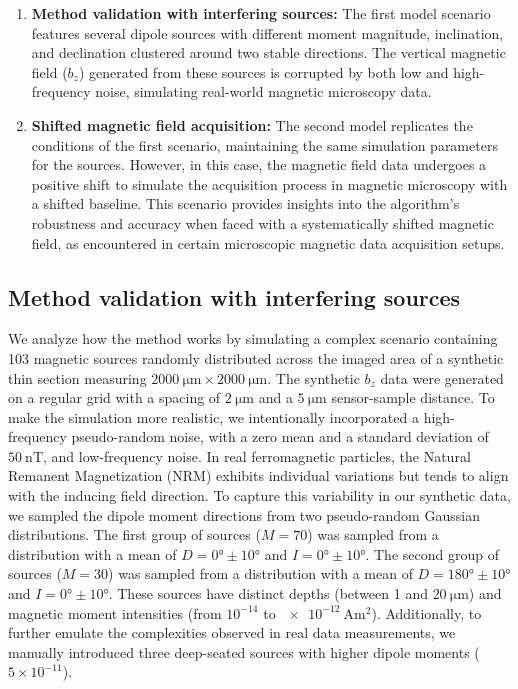 \begin{enumerate}
\item \textbf{Method validation with interfering sources:}
The first model scenario features several dipole sources with different moment magnitude, inclination, and declination clustered around two stable directions. The vertical magnetic field ($b_z$) generated from these sources is corrupted by both low and high-frequency noise, simulating real-world magnetic microscopy data. 

\item \textbf{Shifted magnetic field acquisition:}
The second model replicates the conditions of the first scenario, maintaining the same simulation parameters for the sources. However, in this case, the magnetic field data undergoes a positive shift to simulate the acquisition process in magnetic microscopy with a shifted baseline. This scenario provides insights into the algorithm's robustness and accuracy when faced with a systematically shifted magnetic field, as encountered in certain microscopic magnetic data acquisition setups.
\end{enumerate}

\subsection{Method validation with interfering sources}\label{non-shifted}

We analyze how the method works by simulating a complex scenario containing 103 magnetic sources randomly distributed across the imaged area of a synthetic thin section measuring $\qty{2000}{\um} \times \qty{2000}{\um}$. The synthetic $b_z$ data were generated on a regular grid with a spacing of $\qty{2}{\um}$ and a $\qty{5}{\um}$ sensor-sample distance. To make the simulation more realistic, we intentionally incorporated a high-frequency pseudo-random noise, with a zero mean and a standard deviation of $\qty{50}{\nano\tesla}$, and low-frequency noise. In real ferromagnetic particles, the Natural Remanent Magnetization (NRM) exhibits individual variations but tends to align with the inducing field direction. To capture this variability in our synthetic data, we sampled the dipole moment directions from two pseudo-random Gaussian distributions. The first group of sources ($M = 70$) was sampled from a distribution with a mean of $D = \ang{0}\pm\ang{10}$ and $I = \ang{0}\pm\ang{10}$. The second group of sources ($M = 30$) was sampled from a distribution with a mean of $D = \ang{180}\pm\ang{10}$ and $I = \ang{0}\pm\ang{10}$. These sources have distinct depths (between 1 and $\qty{20}{\um}$) and magnetic moment intensities (from $10^{-14}$ to $\qty{e-12}{\ampere\m\squared}$). Additionally, to further emulate the complexities observed in real data measurements, we manually introduced three deep-seated sources with higher dipole moments ($5 \times 10^{-11}$). 

